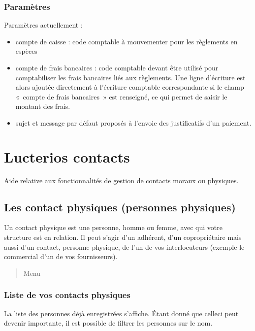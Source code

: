 \documentclass[a4paper,10pt,oneside,french]{sphinxmanual}
\begin{document}
\subsection{Paramètres}
\label{\detokenize{payoff/config:parametres}}
 Paramètres actuellement :
\begin{itemize}
\item {} 
\sphinxAtStartPar
compte de caisse : code comptable à mouvementer pour les règlements en espèces

\item {} 
\sphinxAtStartPar
compte de frais bancaires : code comptable devant être utilisé pour comptabiliser les frais bancaires liés aux règlements. Une ligne d’écriture est alors ajoutée directement à l’écriture comptable correspondante si le champ « compte de frais bancaires » est renseigné, ce qui permet de saisir le montant des frais.

\item {} 
\sphinxAtStartPar
sujet et message par défaut proposés à l’envoie des justificatifs d’un paiement.

\end{itemize}


\chapter{Lucterios contacts}
\label{\detokenize{contacts/index:lucterios-contacts}}\label{\detokenize{contacts/index::doc}}
\sphinxAtStartPar
Aide relative aux fonctionnalités de gestion de contacts moraux ou physiques.


\section{Les contact physiques (personnes physiques)}
\label{\detokenize{contacts/individual:les-contact-physiques-personnes-physiques}}\label{\detokenize{contacts/individual::doc}}
\sphinxAtStartPar
Un contact physique est une personne, homme ou femme, avec qui votre structure est en relation. Il peut s’agir d’un adhérent, d’un copropriétaire mais aussi d’un contact, personne physique, de l’un de vos interlocuteurs (exemple le commercial d’un de vos fournisseurs).
\begin{quote}

\sphinxAtStartPar
Menu 
\end{quote}


\subsection{Liste de vos contacts physiques}
\label{\detokenize{contacts/individual:liste-de-vos-contacts-physiques}}
\sphinxAtStartPar
La liste des personnes déjà enregistrées s’affiche. Étant donné que celle\sphinxhyphen{}ci peut devenir importante, il est possible de filtrer les personnes sur le nom.
\end{document}
